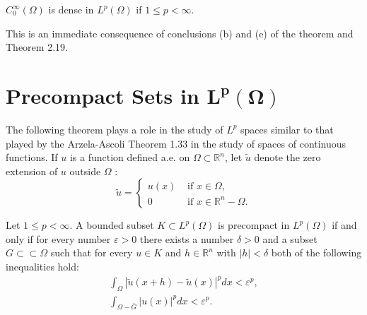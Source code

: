 \begin{corollary}
  $C_0^{\infty}(\Omega)$ is dense in $L^p(\Omega)$ if $1 \leq p<\infty$.
\end{corollary}

This is an immediate consequence of conclusions (b) and (e) of the theorem and Theorem 2.19.


\section[Precompact Sets in $L^p(\Omega)$]{Precompact Sets in $\bm{L^p(\Omega)}$}


\begin{para}
  The following theorem plays a role in the study of $L^p$ spaces similar to that played by the Arzela-Ascoli Theorem 1.33 in the study of spaces of continuous functions. If $u$ is a function defined a.e. on $\Omega \subset \mathbb{R}^n$, let $\tilde{u}$ denote the zero extension of $u$ outside $\Omega$ :
  \[
  \tilde{u} =
  \begin{cases}
    u(x) & \text { if } x \in \Omega, \\ 
    0 & \text { if } x \in \mathbb{R}^n-\Omega.
  \end{cases}
  \]
\end{para}

\begin{theorem}
  Let $1 \leq p<\infty$. A bounded subset $K \subset L^p(\Omega)$ is precompact in $L^p(\Omega)$ if and only if for every number $\varepsilon>0$ there exists a number $\delta>0$ and a subset $G \subset\subset \Omega$ such that for every $u \in K$ and $h \in \mathbb{R}^n$ with $|h|<\delta$ both of the following inequalities hold:
  \[
  \begin{array}{r}
  \int_{\Omega}|\tilde{u}(x+h)-\tilde{u}(x)|^p d x<\varepsilon^p, \\
  \int_{\Omega-\bar{G}}|u(x)|^p d x<\varepsilon^p .
  \end{array}
  \]
\end{theorem}


